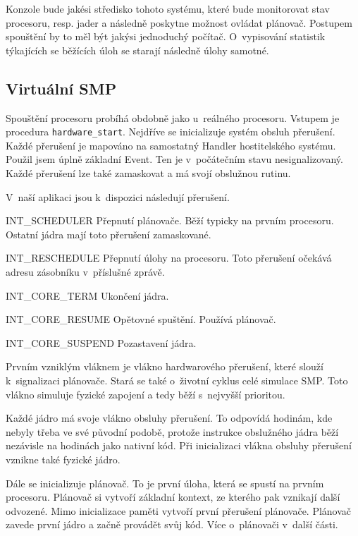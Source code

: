 \documentclass[a4paper,12pt]{article}
\begin{document}
Konzole bude jakési středisko tohoto systému, které bude monitorovat stav procesoru, resp. jader a následně poskytne možnost ovládat plánovač. Postupem spouštění by to měl být jakýsi jednoduchý počítač. O~vypisování statistik týkajících se běžících úloh se starají následně úlohy samotné.

\subsection{Virtuální SMP}
Spouštění procesoru probíhá obdobně jako u~reálného procesoru. Vstupem je procedura
\verb+hardware_start+. Nejdříve se inicializuje
systém obsluh přerušení. Každé přerušení je mapováno na samostatný Handler
hostitelského systému. Použil jsem úplně základní Event. Ten je v~počátečním stavu
nesignalizovaný. Každé přerušení lze také zamaskovat a má svojí obslužnou rutinu.

V~naší aplikaci jsou k~dispozici následují přerušení.

\begin{description}
\item{INT\_SCHEDULER} Přepnutí plánovače. Běží typicky na prvním procesoru. Ostatní
jádra mají toto přerušení zamaskované.
\item{INT\_RESCHEDULE} Přepnutí úlohy na procesoru. Toto přerušení očekává adresu
zásobníku v~příslušné zprávě.
\item{INT\_CORE\_TERM} Ukončení jádra.
\item{INT\_CORE\_RESUME} Opětovné spuštění. Používá plánovač.
\item{INT\_CORE\_SUSPEND} Pozastavení jádra.
\end{description}

Prvním vzniklým vláknem je vlákno hardwarového přerušení, které slouží k~signalizaci
plánovače. Stará se také o~životní cyklus celé simulace SMP. Toto vlákno simuluje
fyzické zapojení a tedy běží s~nejvyšší prioritou.

Každé jádro má svoje vlákno obsluhy přerušení. To odpovídá hodinám, kde nebyly třeba
ve své původní podobě, protože instrukce obslužného jádra běží nezávisle na hodinách
jako nativní kód. Při inicializaci vlákna obsluhy přerušení vznikne také fyzické jádro.

Dále se inicializuje plánovač. To je první úloha, která se spustí na prvním procesoru.
Plánovač si vytvoří základní kontext, ze kterého pak vznikají další odvozené. Mimo inicializace
paměti vytvoří první přerušení plánovače. Plánovač zavede první jádro a začně provádět
svůj kód. Více o~plánovači v~další části.
\end{document}
